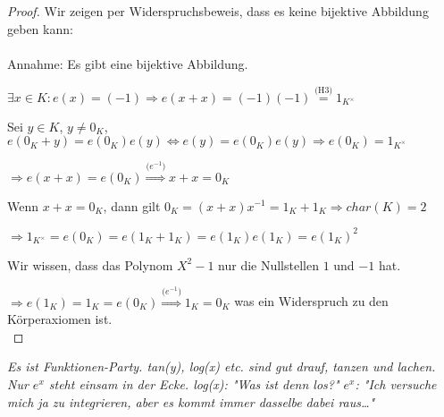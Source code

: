 \documentclass[12pt, letterpaper]{article}
\begin{document}
\begin{proof} 
    Wir zeigen per Widerspruchsbeweis, dass es keine bijektive Abbildung geben kann:
    \\ \\
    Annahme: Es gibt eine bijektive Abbildung.
    \\ \par
    $\exists x \in K : e(x) = (-1) \Rightarrow e(x+x)=(-1)(-1) \overset{\text{(H3)}}{=} 1_{K^\times} $
    \par
    Sei $y \in K$, $y\neq 0_K$, $e(0_K + y) = e(0_K)e(y) \Leftrightarrow  e(y) = e(0_K)e(y) \Rightarrow e(0_K) = 1_{K^\times} $
    \par
    $\Rightarrow e(x+x) = e(0_K) \overset{\text{($e^{-1}$)}}{\Rightarrow} x+x = 0_K $
    \par
    Wenn $x+x = 0_K$, dann gilt $0_K=(x+x)x^{-1} = 1_K+1_K \Rightarrow char(K)=2 $
    \par
    $\Rightarrow 1_{K^\times} = e(0_K) = e(1_K+1_K) = e(1_K)e(1_K) = e(1_K)^2 $ \\
    \par
    Wir wissen, dass das Polynom $X^2 - 1$ nur die Nullstellen $1$ und $-1$ hat. 
    \par
    $\Rightarrow e(1_K) = 1_K = e(0_K) \overset{\text{($e^{-1})$}}{\Rightarrow} 1_K = 0_K $ was ein Widerspruch zu den Körperaxiomen ist. \\ 
\end{proof}

\par
\textit{Es ist Funktionen-Party. tan(y), log(x) etc. sind gut drauf, tanzen und lachen. Nur $e^x$ steht einsam in der Ecke. log(x): "Was ist denn los?" $e^x$: "Ich versuche mich ja zu integrieren, aber es kommt immer dasselbe dabei raus…"}
\end{document}
